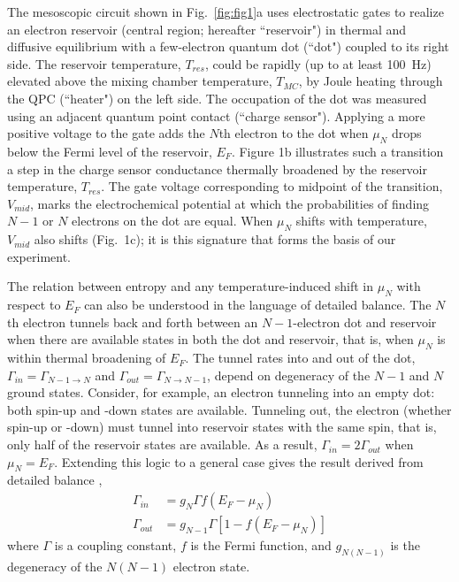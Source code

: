 \documentclass[twocolumn,showpacs,preprintnumbers,amsmath,amssymb,pra,aps,superscriptaddress]{revtex4-1}
\begin{document}
The mesoscopic circuit shown in Fig.~\ref{fig:fig1}a uses electrostatic gates to realize an electron reservoir (central region; hereafter ``reservoir") in thermal and diffusive equilibrium with a few-electron quantum dot (``dot") coupled to its right side.  The reservoir temperature, $T_{res}$, could be rapidly (up to at least \SI{100}{\hertz}) elevated above the mixing chamber temperature, $T_{MC}$, by Joule heating through the QPC (``heater") on the left side.  The occupation of the dot was measured using an adjacent quantum point contact (``charge sensor")\cite{Staring2007, Thierschmann2015}.  Applying a more positive voltage to the gate adds the $N$th electron to the dot when $\mu_{N}$ drops below the Fermi level of the reservoir, $E_F$. Figure 1b illustrates such a transition \textemdash a step in the charge sensor conductance \textemdash thermally broadened by the reservoir temperature, $T_{res}$.  The gate voltage corresponding to midpoint of the transition, $V_{mid}$, marks the electrochemical potential at which the probabilities of finding $N-1$ or $N$ electrons on the dot are equal.  When $\mu_N$ shifts with temperature, $V_{mid}$ also shifts (Fig.~1c); it is this signature that forms the basis of our experiment.%
  
The relation between entropy and any temperature-induced shift in $\mu_{N}$ with respect to $E_F$ can also be understood in the language of detailed balance.  The $N$th electron tunnels back and forth between an $N-1$-electron dot and reservoir when there are available states in both the dot and reservoir, that is, when $\mu_{N}$ is within thermal broadening of $E_F$.  The tunnel rates into and out of the dot, $\Gamma_{in}=\Gamma_{N-1\rightarrow N}$ and $\Gamma_{out}=\Gamma_{N\rightarrow N-1}$, depend on degeneracy of the $N-1$ and $N$ ground states.  %
Consider, for example, an electron tunneling into an empty dot: both spin-up and -down states are available.  Tunneling out, the electron (whether spin-up or -down) must tunnel into reservoir states with the same spin, that is, only half of the reservoir states are available.  As a result, $\Gamma_{in} = 2\Gamma_{out}$ when $\mu_{N}=E_F$.  Extending this logic to a general case gives the result derived from detailed balance \cite{Gustavsson2009}, 
%
\begin{align}
	\Gamma_{in} &=  g_{N} \Gamma f(E_F - \mu_{N}) \nonumber \\
	\Gamma_{out} &= g_{N-1} \Gamma [1 - f(E_F - \mu_{N})] \label{eqn:rates}
\end{align}
%
where $\Gamma$ is a coupling constant, $f$ is the Fermi function, and $g_{N(N-1)}$ is the degeneracy of the $N(N-1)$ electron state.
\end{document}
